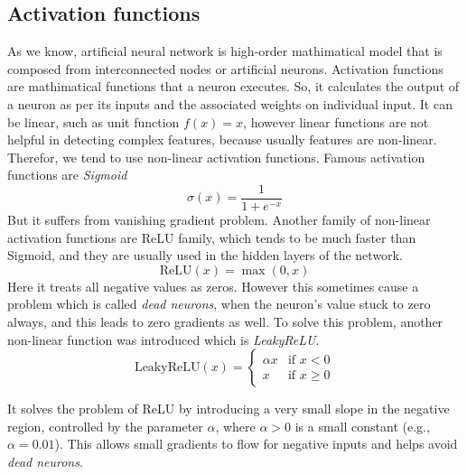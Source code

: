 \subsection{Activation functions}
As we know, artificial neural network is high-order mathimatical model that is composed from interconnected nodes or artificial neurons. Activation functions are mathimatical functions that a neuron executes. So, it calculates the output of a neuron as per its inputs and the associated weights on individual input. It can be linear, such as unit function $f(x) = x$, however linear functions are not helpful in detecting complex features, because usually features are non-linear. Therefor, we tend to use non-linear activation functions. Famous activation functions are \textit{Sigmoid} \[ 
\sigma(x) = \frac{1}{1 + e^{-x}}
\] But it suffers from vanishing gradient problem. Another family of non-linear activation functions are \ac{ReLU} family, which tends to be much faster than Sigmoid, and they are usually used in the hidden layers of the network. \[
\text{ReLU}(x) = \max(0, x)
\] Here it treats all negative values as zeros. However this sometimes cause a problem which is called \textit{dead neurons}, when the neuron's value stuck to zero always, and this leads to  zero gradients as well. To solve this problem, another non-linear function was introduced which is \textit{LeakyReLU}. \[
\text{LeakyReLU}(x) =
\begin{cases}
\alpha x & \text{if } x < 0 \\
x & \text{if } x \ge 0
\end{cases}
\]

It solves the problem of ReLU by introducing a very small slope in the negative region, controlled by the parameter $\alpha$, where $\alpha > 0$ is a small constant (e.g., $\alpha = 0.01$). This allows small gradients to flow for negative inputs and helps avoid \textit{dead neurons}.


